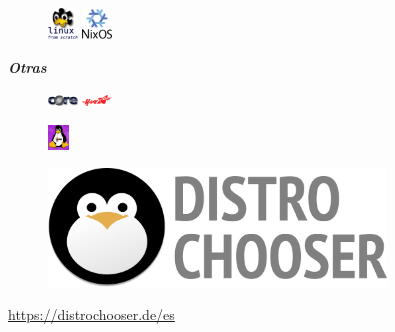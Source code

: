\documentclass[aspectratio=43]{beamer}
\begin{document}
\begin{frame}{\secname}{\subsecname}
\begin{multicols}{3}
\begin{figure}
            \end{figure}
            \begin{figure}
                \includegraphics[width=0.07\textwidth]{img/lfs.png}
                \includegraphics[width=0.07\textwidth]{img/nixos.png}
            \end{figure}
            \newpage
            \pause
            \centering \textbf{\textit{Otras}}
            \begin{figure}
                \includegraphics[width=0.07\textwidth]{img/tinycore.png}
                \includegraphics[width=0.07\textwidth]{img/redstaros.png}
            \end{figure}
            \begin{figure}
                \includegraphics[width=0.05\textwidth]{img/hannah.png}
            \end{figure}
        \end{multicols}
    \end{frame}

    \begin{frame}{\secname}{\subsecname}
        \centering
        \begin{figure}
            \includegraphics[width=0.8\textwidth]{img/distrochooser.png}
        \end{figure}
        \centering \url{https://distrochooser.de/es}
    \end{frame}
\end{document}
